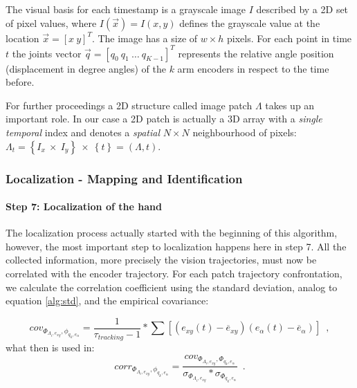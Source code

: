 \documentclass[conference]{IEEEtran}
\begin{document}
The visual basis for each timestamp is a grayscale image $I$ described by a 2D set of pixel values, where $I(\vec{x})=I(x,y)$ defines the grayscale value at the location $\vec{x}=\left[x\ y\right]^T$. The image has a size of $w \times h$ pixels. 
For each point in time $t$ the joints vector $\vec{q} = \left[ q_{0}\ q_1\ \ldots\ q_{K-1} \right]^T$ represents the relative angle position (displacement in degree angles) of the $k$ arm encoders in respect to the time before. %

For further proceedings a 2D structure called image patch $\Lambda$ takes up an important role. In our case a 2D patch is actually a 3D array with a \textit{single temporal} index and denotes a \textit{spatial} $N \times N$ neighbour\-hood of pixels: $\Lambda_t = \left\{I_x\ \times\ I_y\right\}\ \times\ \left\{t\right\} = \left(\Lambda, t\right)$.



\subsubsection{Localization - Mapping and Identification}
\label{halose:halo:algorithm:localization}
%
\paragraph{Step 7: Localization of the hand}
\label{halose:halo:algorithm:step7}
%
The localization process actually started with the beginning of this algorithm, however, the most important step to localization happens here in step 7. All the collected information, more precisely the vision trajectories, must now be correlated with the encoder trajectory. For each patch trajectory confrontation, we calculate the correlation coefficient using the standard deviation, analog to equation \ref{alg:std}, and the empirical covariance:

\begin{equation}
\label{covariance}
	cov_{\Phi_{\Lambda_{i}, e_{xy}}, \phi_{q_{k}, e_{\alpha}}} = \frac{1}{\tau_{tracking}-1} * \sum \left[  \left(e_{xy}\left(t\right) - \overline{e}_{xy} \right) \left(e_{\alpha}\left(t\right) - \overline{e}_{\alpha}  \right) \right] \enspace ,
\end{equation}
what then is used in:
%
\begin{equation}
\label{correlation}
corr_{\Phi_{\Lambda_{i}, e_{xy}}, \phi_{q_{k}, e_{\alpha}}} = \frac{cov_{\Phi_{\Lambda_{i}, e_{xy}}, \Phi_{q_{k}, e_{\alpha}}}}{ \sigma_{\Phi_{\Lambda_{i}, e_{xy}}} * \sigma_{\Phi_{q_{k}, e_{\alpha}}}} \enspace .
\end{equation}
\end{document}
